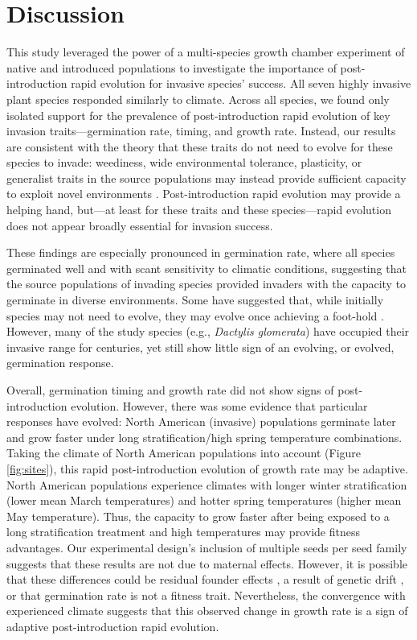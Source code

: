 \documentclass[12pt]{article}\usepackage[]{graphicx}\usepackage[]{color}
\begin{document}
	\section{Discussion}
	
	This study leveraged the power of a multi-species growth chamber experiment of native and introduced populations to investigate the importance of post-introduction rapid evolution for invasive species' success. All seven highly invasive plant species responded similarly to climate. Across all species, we found only isolated support for the prevalence of post-introduction rapid evolution of key invasion traits---germination rate, timing, and growth rate. Instead, our results are consistent with the theory that these traits do not need to evolve for these species to invade: weediness, wide environmental tolerance, plasticity, or generalist traits in the source populations may instead provide sufficient capacity to exploit novel environments \parencite{Baker1965}. Post-introduction rapid evolution may provide a helping hand, but---at least for these traits and these species---rapid evolution does not appear broadly essential for invasion success. %
	
	These findings are especially pronounced in germination rate, where all species germinated well and with scant sensitivity to climatic conditions, suggesting that the source populations of invading species provided invaders with the capacity to germinate in diverse environments. Some have suggested that, while initially species may not need to evolve, they may evolve once achieving a foot-hold \parencite{Lamarque2015}. However, many of the study species (e.g., \textit{Dactylis glomerata}) have occupied their invasive range for centuries, yet still show little sign of an evolving, or evolved, germination response. 
	
	Overall, germination timing and growth rate did not show signs of post-introduction evolution. However, there was some evidence that particular responses have evolved: North American (invasive) populations germinate later and grow faster under long stratification/high spring temperature combinations. Taking the climate of North American populations into account (Figure \ref{fig:sites}), this rapid post-introduction evolution of growth rate may be adaptive. North American populations experience climates with longer winter stratification  (lower mean March temperatures) and hotter spring temperatures (higher mean May temperature). Thus, the capacity to grow faster after being exposed to a long stratification treatment and high temperatures may provide fitness advantages. Our experimental design's inclusion of multiple seeds per seed family suggests that these results are not due to maternal effects. However, it is  possible that these differences could be residual founder effects \parencite{Shirk2014}, a result of genetic drift \parencite{Eckert1996}, or that germination rate is not a fitness trait. Nevertheless, the convergence with experienced climate suggests that this observed change in growth rate is a sign of adaptive post-introduction rapid evolution. 
	
\end{document}
